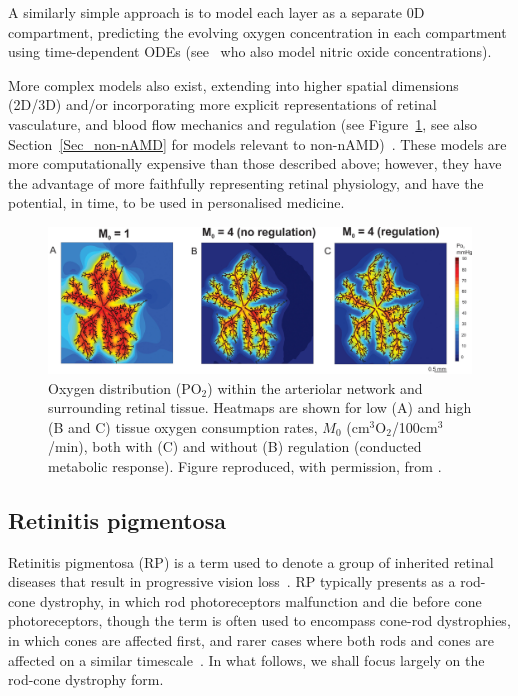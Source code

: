 \documentclass{article}
\begin{document}
A similarly simple approach is to model each layer as a separate 0D compartment, predicting the evolving oxygen concentration in each compartment using time-dependent ODEs (see~\cite{German_et_al_2021} who also model nitric oxide concentrations).

More complex models also exist, extending into higher spatial dimensions (2D/3D) and/or incorporating more explicit representations of retinal vasculature, and blood flow mechanics and regulation (see Figure~\ref{Fig_Fry2020}, see also Section~\ref{Sec_non-nAMD} for models relevant to non-nAMD)~\cite{Aquah_et_al_2021,Arciero_et_al_2021,Causin_2015,Friedland_1978,Fry_et_al_2018,Fry_et_al_2020,Linsenmeier_and_Zhang_2017,McDougall_et_al_2012,Watson_et_al_2012}.
These models are more computationally expensive than those described above; however, they have the advantage of more faithfully representing retinal physiology, and have the potential, in time, to be used in personalised medicine.
%
\begin{figure}
\begin{center}
\includegraphics[scale=0.95]{Fry_et_al_2020_Fig_3_ABC}
\end{center}
\caption{Oxygen distribution (PO$_2$) within the arteriolar network and surrounding retinal tissue. Heatmaps are shown for low (A) and high (B and C) tissue oxygen consumption rates, $M_0$ (cm$^3$O$_2$/100cm$^3$/min), both with (C) and without (B) regulation (conducted metabolic response). Figure reproduced, with permission, from \citet{Fry_et_al_2020}.}
\label{Fig_Fry2020}
\end{figure}
%
%
\subsection{Retinitis pigmentosa}\label{Sec_RP}
%
Retinitis pigmentosa (RP) is a term used to denote a group of inherited retinal diseases that result in progressive vision loss~\cite{Hamel_2006,Hartong_et_al_2006}. RP typically presents as a rod-cone dystrophy, in which rod photoreceptors malfunction and die before cone photoreceptors, though the term is often used to encompass cone-rod dystrophies, in which cones are affected first, and rarer cases where both rods and cones are affected on a similar timescale~\cite{Hamel_2006,Hartong_et_al_2006}. In what follows, we shall focus largely on the rod-cone dystrophy form.
\end{document}
